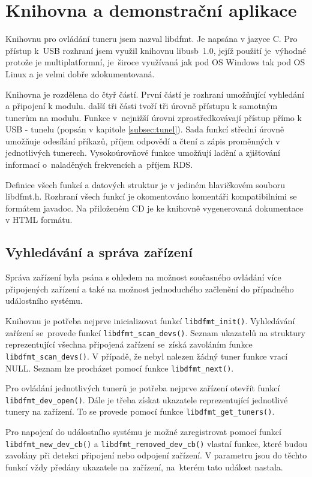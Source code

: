 \section{Knihovna a demonstrační aplikace}
\label{sec:knihovna}

Knihovnu pro ovládání tuneru jsem nazval libdfmt. Je napsána v jazyce C. Pro přístup k~USB rozhraní jsem využil knihovnu libusb~1.0, jejíž použití je~výhodné protože je multiplatformní, je~široce využívaná jak pod OS Windows tak pod OS Linux a je velmi dobře zdokumentovaná.

Knihovna je rozdělena do čtyř částí. První částí je rozhraní umožňující vyhledání a připojení k modulu. další tři části tvoří  tři úrovně přístupu k samotným tunerům na modulu. Funkce v~nejnižší úrovni zprostředkovávají přístup přímo k USB - \iic tunelu (popsán v kapitole \ref{subsec:tunel}). Sada funkcí střední úrovně umožňuje odesílání příkazů, příjem odpovědí a čtení a zápis proměnných v jednotlivých tunerech. Vysokoúrovňové funkce umožňují ladění a zjišťování informací o~naladěných frekvencích a~příjem RDS.

Definice všech funkcí a datových struktur je v jediném hlavičkovém souboru libdfmt.h. Rozhraní všech funkcí je okomentováno komentáři kompatibilními se formátem javadoc. Na přiloženém CD je ke knihovně vygenerovaná dokumentace v HTML formátu.

\subsection{Vyhledávání a správa zařízení}

Správa zařízení byla psána s ohledem na možnost současného ovládání více připojených zařízení a také na možnost jednoduchého začlenění do případného událostního systému.

Knihovnu je potřeba nejprve inicializovat funkcí \verb|libdfmt_init()|. Vyhledávání zařízení se~provede funkcí \verb|libdfmt_scan_devs()|. Seznam ukazatelů na struktury reprezentující všechna připojená zařízení se~získá zavoláním funkce \verb|libdfmt_scan_devs()|. V případě, že nebyl nalezen žádný tuner funkce vrací NULL. Seznam lze procházet pomocí funkce \verb|libdfmt_next()|. 

Pro ovládání jednotlivých tunerů je potřeba nejprve zařízení otevřít funkcí \verb|libdfmt_dev_open()|. Dále je třeba získat ukazatele reprezentující jednotlivé tunery na zařízení. To se provede pomocí funkce \verb|libdfmt_get_tuners()|.

Pro napojení do událostního systému je možné zaregistrovat pomocí funkcí \verb|libdfmt_new_dev_cb()| a \verb|libdfmt_removed_dev_cb()| vlastní funkce, které budou zavolány při detekci připojení nebo odpojení zařízení. V parametru jsou do těchto funkcí vždy předány ukazatele na~zařízení, na~kterém tato událost nastala.

